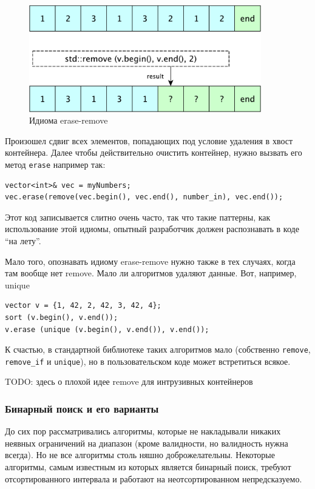 \documentclass[a4paper,12pt,oneside]{article}
\begin{document}
\begin{figure}[h!]
\centering
\includegraphics[width=0.9\textwidth]{illustrations/erase-remove-crop.pdf}
\caption{Идиома erase-remove}
\label{fig:erase_remove}
\end{figure}

Произошел сдвиг всех элементов, попадающих под условие удаления в хвост контейнера. Далее чтобы действительно очистить контейнер, нужно вызвать его метод \lstinline!erase! например так:

\begin{lstlisting}
vector<int>& vec = myNumbers;
vec.erase(remove(vec.begin(), vec.end(), number_in), vec.end());
\end{lstlisting}

Этот код записывается слитно очень часто, так что такие паттерны, как использование этой идиомы, опытный разработчик должен распознавать в коде ``на лету''.

Мало того, опознавать идиому erase-remove нужно также в тех случаях, когда там вообще нет remove. Мало ли алгоритмов удаляют данные. Вот, например, unique

\begin{lstlisting}
vector v = {1, 42, 2, 42, 3, 42, 4};
sort (v.begin(), v.end());
v.erase (unique (v.begin(), v.end()), v.end());
\end{lstlisting}

К счастью, в стандартной библиотеке таких алгоритмов мало (собственно \lstinline!remove!, \lstinline!remove_if! и \lstinline!unique!), но в пользовательском коде может встретиться всякое.

TODO: здесь о плохой идее remove для интрузивных контейнеров

\subsubsection{Бинарный поиск и его варианты}

До сих пор рассматривались алгоритмы, которые не накладывали никаких неявных ограничений на диапазон (кроме валидности, но валидность нужна всегда). Но не все алгоритмы столь няшно доброжелательны. Некоторые алгоритмы, самым известным из которых является бинарный поиск, требуют отсортированного интервала и работают на неотсортированном непредсказуемо.
\end{document}
